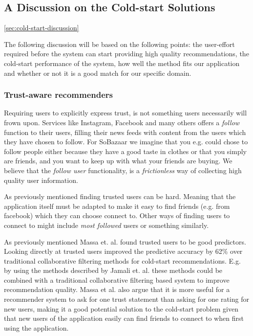 \subsection{A Discussion on the Cold-start Solutions}
\ref{sec:cold-start-discussion}

The following discussion will be based on the following points: the user-effort
required before the system can start providing high quality recommendations, the
cold-start performance of the system, how well the method fits our application
and whether or not it is a good match for our specific domain.

\subsubsection{Trust-aware recommenders}

Requiring users to explicitly express trust, is not something users necessarily
will frown upon. Services like Instagram, Facebook and many others offers a
\emph{follow} function to their users, filling their news feeds with content from
the users which they have chosen to follow. For SoBazaar we imagine that you
e.g. could chose to follow people either because they have a good taste in
clothes or that you simply are friends, and you want to keep up with what your
friends are buying. We believe that the \emph{follow user} functionality, is
a \emph{frictionless} way of collecting high quality user information.

As previously mentioned finding trusted users can be hard. Meaning that the
application itself must be adapted to make it easy to find friends (e.g. from facebook)
which they can choose connect to. Other ways of finding users to connect to might
include \emph{most followed} users or something similarly.

As previously mentioned Massa et. al. \cite{Massa2007} found trusted users
to be good predictors. Looking directly at trusted users improved the
predictive accuracy by 62\% over traditional collaborative filtering methods
for cold-start recommendations. E.g. by using the methods described by
Jamali et. al. \cite{Jamali2009} these methods could be combined with a traditional collaborative
filtering based system to improve recommendation quality. Massa et al. \cite{Massa2004} also argue that it is more
useful for a recommender system to ask for one trust statement than asking for
one rating for new users, making it a good potential solution to the cold-start
problem given that new users of the application easily can find friends
to connect to when first using the application.

